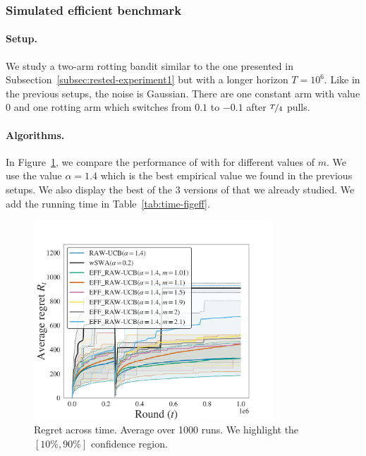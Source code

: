\subsubsection{Simulated efficient benchmark}
\paragraph{Setup.} We study a two-arm rotting bandit similar to the one presented in Subsection~\ref{subsec:rested-experiment1} but with a longer horizon $T = 10^6$. Like in the previous setups, the noise is Gaussian. There are one constant arm with value $0$ and one rotting arm which switches from $0.1$ to $-0.1$ after $\nicefrac{T}{4}$ pulls.

\paragraph{Algorithms.} In Figure~\ref{fig:rested-eff}, we compare the performance of \RAWUCB with \EFFRAW for different values of $m$. We use the value $\alpha = 1.4$ which is the best empirical value we found in the previous setups. We also display the best of the 3 versions of \wSWA that we already studied. We add the running time in Table~\ref{tab:time-figeff}. 
\begin{figure}[h!]
\centering
\includegraphics[width = 0.8\textwidth]{3Rested/fig/fig_eff.pdf}
\caption{Regret across time. Average over 1000 runs. We highlight the $\left[10\%, 90\%\right]$ confidence region.} 
\label{fig:rested-eff}
\end{figure}

